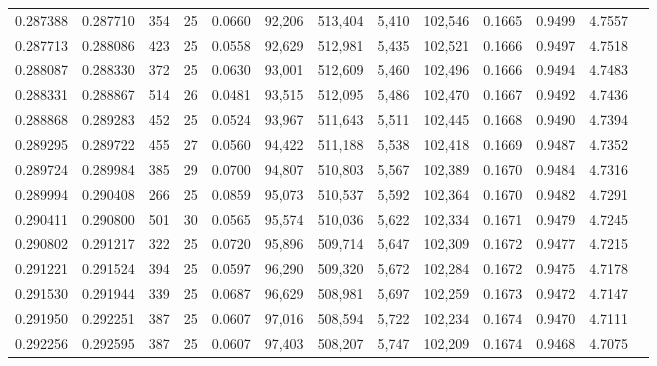 \begin{tabular}{rrrrrrrrrrrrr}
0.287388 & 0.287710 & 354 &  25 &                                     0.0660 &  92,206 & 513,404 &   5,410 & 102,546 & 0.1665 & 0.9499 & 4.7557 \\
0.287713 & 0.288086 & 423 &  25 &                                     0.0558 &  92,629 & 512,981 &   5,435 & 102,521 & 0.1666 & 0.9497 & 4.7518 \\
0.288087 & 0.288330 & 372 &  25 &                                     0.0630 &  93,001 & 512,609 &   5,460 & 102,496 & 0.1666 & 0.9494 & 4.7483 \\
0.288331 & 0.288867 & 514 &  26 &                                     0.0481 &  93,515 & 512,095 &   5,486 & 102,470 & 0.1667 & 0.9492 & 4.7436 \\
0.288868 & 0.289283 & 452 &  25 &                                     0.0524 &  93,967 & 511,643 &   5,511 & 102,445 & 0.1668 & 0.9490 & 4.7394 \\
0.289295 & 0.289722 & 455 &  27 &                                     0.0560 &  94,422 & 511,188 &   5,538 & 102,418 & 0.1669 & 0.9487 & 4.7352 \\
0.289724 & 0.289984 & 385 &  29 &                                     0.0700 &  94,807 & 510,803 &   5,567 & 102,389 & 0.1670 & 0.9484 & 4.7316 \\
0.289994 & 0.290408 & 266 &  25 &                                     0.0859 &  95,073 & 510,537 &   5,592 & 102,364 & 0.1670 & 0.9482 & 4.7291 \\
0.290411 & 0.290800 & 501 &  30 &                                     0.0565 &  95,574 & 510,036 &   5,622 & 102,334 & 0.1671 & 0.9479 & 4.7245 \\
0.290802 & 0.291217 & 322 &  25 &                                     0.0720 &  95,896 & 509,714 &   5,647 & 102,309 & 0.1672 & 0.9477 & 4.7215 \\
0.291221 & 0.291524 & 394 &  25 &                                     0.0597 &  96,290 & 509,320 &   5,672 & 102,284 & 0.1672 & 0.9475 & 4.7178 \\
0.291530 & 0.291944 & 339 &  25 &                                     0.0687 &  96,629 & 508,981 &   5,697 & 102,259 & 0.1673 & 0.9472 & 4.7147 \\
0.291950 & 0.292251 & 387 &  25 &                                     0.0607 &  97,016 & 508,594 &   5,722 & 102,234 & 0.1674 & 0.9470 & 4.7111 \\
0.292256 & 0.292595 & 387 &  25 &                                     0.0607 &  97,403 & 508,207 &   5,747 & 102,209 & 0.1674 & 0.9468 & 4.7075 \\

\end{tabular}
